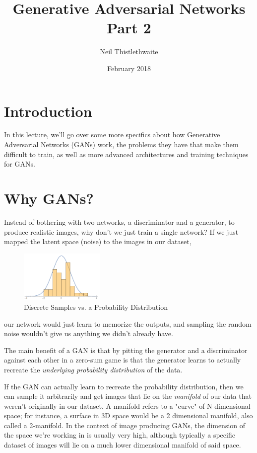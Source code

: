 \documentclass{article}
\title{Generative Adversarial Networks Part 2}
\author{Neil Thistlethwaite}
\date{February 2018}
\begin{document}
\maketitle

\section{Introduction}
In this lecture, we'll go over some more specifics about how Generative Adversarial Networks (GANs) work, the problems they have that make them difficult to train, as well as more advanced architectures and training techniques for GANs.

\section{Why GANs?}



Instead of bothering with two networks, a discriminator and a generator, to produce realistic images, why don't we just train a single network? If we just mapped the latent space (noise) to the images in our dataset,
\begin{figure}
  \begin{center}
    \vspace*{-0.2in}
    \includegraphics[width=0.36\textwidth]{samples_vs_distribution}
  \end{center}
  \vspace*{-0.1in}
  \caption{Discrete Samples vs. a Probability Distribution}
\end{figure}
our network would just learn to memorize the outputs, and sampling the random noise wouldn't give us anything we didn't already have.

The main benefit of a GAN is that by pitting the generator and a discriminator against each other in a zero-sum game is that the generator learns to actually recreate the \textit{underlying probability distribution} of the data.

If the GAN can actually learn to recreate the probability distribution, then we can sample it arbitrarily and get images that lie on the \textit{manifold} of our data that weren't originally in our dataset. A manifold refers to a "curve" of N-dimensional space; for instance, a surface in 3D space would be a 2 dimensional manifold, also called a 2-manifold. In the context of image producing GANs, the dimension of the space we're working in is usually very high, although typically a specific dataset of images will lie on a much lower dimensional manifold of said space.
\end{document}
